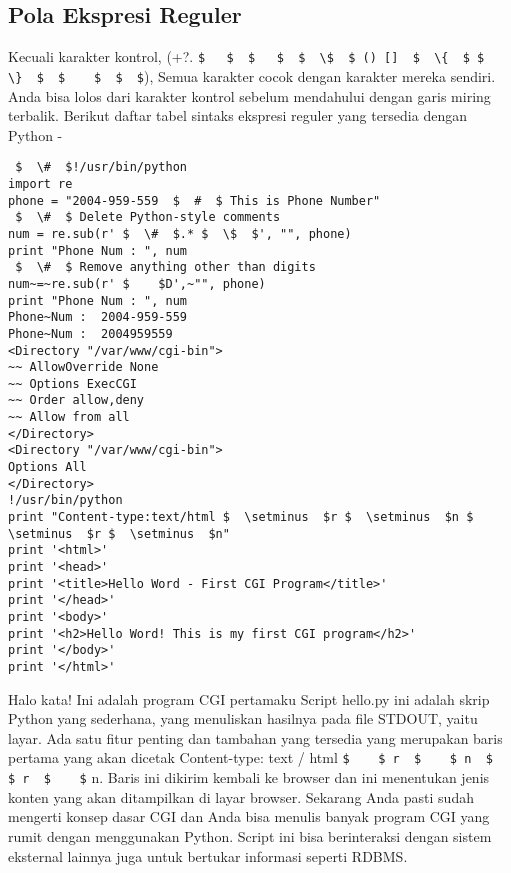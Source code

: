 \begin{enumerate}
\begin{enumerate}
\subsection{Pola Ekspresi Reguler}
Kecuali karakter kontrol, (+?.  \verb|$   $  $   $  $  \$  $ () []  $  \{  $ $  \}  $  $    $  $  $|), Semua karakter cocok dengan karakter mereka sendiri. Anda bisa lolos dari karakter kontrol sebelum mendahului dengan garis miring terbalik.
Berikut daftar tabel sintaks ekspresi reguler yang tersedia dengan Python -
\begin{verbatim}
 $  \#  $!/usr/bin/python
import re
phone = "2004-959-559  $  #  $ This is Phone Number"
 $  \#  $ Delete Python-style comments
num = re.sub(r' $  \#  $.* $  \$  $', "", phone)
print "Phone Num : ", num
 $  \#  $ Remove anything other than digits
num~=~re.sub(r' $    $D',~"", phone)
print "Phone Num : ", num
Phone~Num :  2004-959-559
Phone~Num :  2004959559
<Directory "/var/www/cgi-bin">
~~ AllowOverride None
~~ Options ExecCGI
~~ Order allow,deny
~~ Allow from all
</Directory>
<Directory "/var/www/cgi-bin">
Options All
</Directory>
!/usr/bin/python
print "Content-type:text/html $  \setminus  $r $  \setminus  $n $  \setminus  $r $  \setminus  $n"
print '<html>'
print '<head>'
print '<title>Hello Word - First CGI Program</title>'
print '</head>'
print '<body>'
print '<h2>Hello Word! This is my first CGI program</h2>'
print '</body>'
print '</html>'
\end{verbatim}
Halo kata! Ini adalah program CGI pertamaku
Script hello.py ini adalah skrip Python yang sederhana, yang menuliskan hasilnya pada file STDOUT, yaitu layar. Ada satu fitur penting dan tambahan yang tersedia yang merupakan baris pertama yang akan dicetak Content-type: text / html  \verb|$    $ r  $    $ n  $    $ r  $    $| n. Baris ini dikirim kembali ke browser dan ini menentukan jenis konten yang akan ditampilkan di layar browser. Sekarang Anda pasti sudah mengerti konsep dasar CGI dan Anda bisa menulis banyak program CGI yang rumit dengan menggunakan Python. Script ini bisa berinteraksi dengan sistem eksternal lainnya juga untuk bertukar informasi seperti RDBMS.

\end{enumerate}
\end{enumerate}
